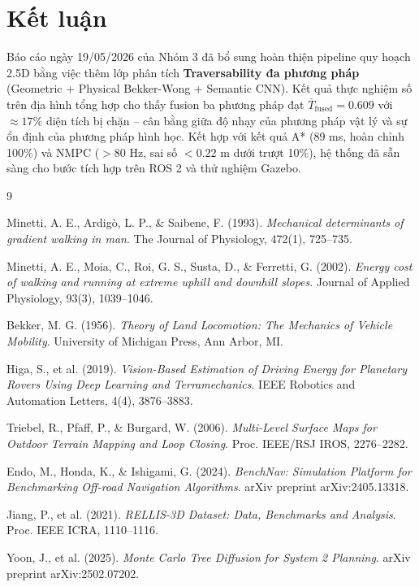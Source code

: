 \documentclass[12pt, a4paper]{article}
\begin{document}
\section{Kết luận}

Báo cáo ngày 19/05/2026 của Nhóm 3 đã bổ sung hoàn thiện pipeline quy hoạch 2.5D bằng việc thêm lớp phân tích \textbf{Traversability đa phương pháp} (Geometric + Physical Bekker-Wong + Semantic CNN). Kết quả thực nghiệm số trên địa hình tổng hợp cho thấy fusion ba phương pháp đạt $\bar{T}_{\text{fused}} = 0.609$ với $\approx 17\%$ diện tích bị chặn -- cân bằng giữa độ nhạy của phương pháp vật lý và sự ổn định của phương pháp hình học. Kết hợp với kết quả A* (89 ms, hoàn chỉnh 100\%) và NMPC ($>80$ Hz, sai số $< 0.22$ m dưới trượt 10\%), hệ thống đã sẵn sàng cho bước tích hợp trên ROS 2 và thử nghiệm Gazebo.

\renewcommand{\refname}{Tài liệu tham khảo}
\begin{thebibliography}{9}

Minetti, A. E., Ardigò, L. P., \& Saibene, F. (1993).
\textit{Mechanical determinants of gradient walking in man}.
The Journal of Physiology, 472(1), 725--735.

Minetti, A. E., Moia, C., Roi, G. S., Susta, D., \& Ferretti, G. (2002).
\textit{Energy cost of walking and running at extreme uphill and downhill slopes}.
Journal of Applied Physiology, 93(3), 1039--1046.

Bekker, M. G. (1956).
\textit{Theory of Land Locomotion: The Mechanics of Vehicle Mobility}.
University of Michigan Press, Ann Arbor, MI.

Higa, S., et al. (2019).
\textit{Vision-Based Estimation of Driving Energy for Planetary Rovers Using Deep Learning and Terramechanics}.
IEEE Robotics and Automation Letters, 4(4), 3876--3883.

Triebel, R., Pfaff, P., \& Burgard, W. (2006).
\textit{Multi-Level Surface Maps for Outdoor Terrain Mapping and Loop Closing}.
Proc. IEEE/RSJ IROS, 2276--2282.

Endo, M., Honda, K., \& Ishigami, G. (2024).
\textit{BenchNav: Simulation Platform for Benchmarking Off-road Navigation Algorithms}.
arXiv preprint arXiv:2405.13318.

Jiang, P., et al. (2021).
\textit{RELLIS-3D Dataset: Data, Benchmarks and Analysis}.
Proc. IEEE ICRA, 1110--1116.

Yoon, J., et al. (2025).
\textit{Monte Carlo Tree Diffusion for System 2 Planning}.
arXiv preprint arXiv:2502.07202.

\end{thebibliography}
\end{document}
